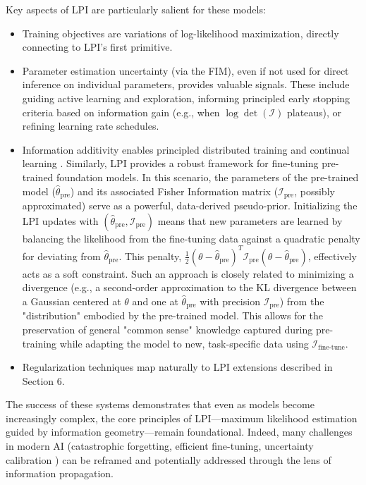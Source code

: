 \documentclass[11pt]{article}
\begin{document}
Key aspects of LPI are particularly salient for these models:
\begin{itemize}
\item Training objectives are variations of log-likelihood maximization, directly connecting to LPI's first primitive.
\item Parameter estimation uncertainty (via the FIM), even if not used for direct inference on individual parameters, provides valuable signals. These include guiding active learning \cite{settles2009active} and exploration, informing principled early stopping criteria based on information gain (e.g., when $\log\det(\mathcal{I})$ plateaus), or refining learning rate schedules.
\item Information additivity enables principled distributed training and continual learning \cite{kirkpatrick2017overcoming, parisi2019continual}. Similarly, LPI provides a robust framework for fine-tuning pre-trained foundation models. In this scenario, the parameters of the pre-trained model ($\hat{\theta}_{\text{pre}}$) and its associated Fisher Information matrix ($\mathcal{I}_{\text{pre}}$, possibly approximated) serve as a powerful, data-derived pseudo-prior. Initializing the LPI updates with $(\hat{\theta}_{\text{pre}}, \mathcal{I}_{\text{pre}})$ means that new parameters are learned by balancing the likelihood from the fine-tuning data against a quadratic penalty for deviating from $\hat{\theta}_{\text{pre}}$. This penalty, $\frac{1}{2} (\theta - \hat{\theta}_{\text{pre}})^T \mathcal{I}_{\text{pre}} (\theta - \hat{\theta}_{\text{pre}})$, effectively acts as a soft constraint. Such an approach is closely related to minimizing a divergence (e.g., a second-order approximation to the KL divergence between a Gaussian centered at $\theta$ and one at $\hat{\theta}_{\text{pre}}$ with precision $\mathcal{I}_{\text{pre}}$) from the "distribution" embodied by the pre-trained model. This allows for the preservation of general "common sense" knowledge captured during pre-training while adapting the model to new, task-specific data using $\mathcal{I}_{\text{fine-tune}}$.
\item Regularization techniques map naturally to LPI extensions described in Section 6.
\end{itemize}

The success of these systems demonstrates that even as models become increasingly complex, the core principles of LPI---maximum likelihood estimation guided by information geometry---remain foundational. Indeed, many challenges in modern AI (catastrophic forgetting, efficient fine-tuning, uncertainty calibration \cite{guo2017calibration}) can be reframed and potentially addressed through the lens of information propagation.
\end{document}
